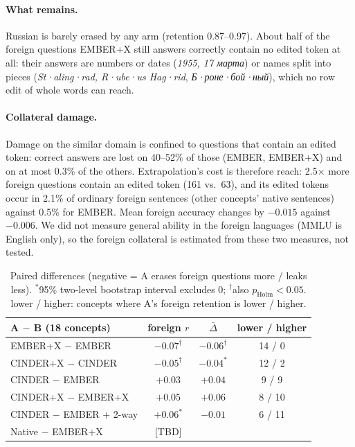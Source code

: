 \paragraph{What remains.}
Russian is barely erased by any arm (retention 0.87--0.97).
About half of the foreign questions EMBER+X still answers correctly contain no edited token at all: their answers are numbers or dates (\emph{1955, 17 марта}) or names split into pieces (\emph{St·aling·rad, R·ube·us Hag·rid}, \emph{Б·роне·бой·ный}), which no row edit of whole words can reach.

\paragraph{Collateral damage.}
Damage on the similar domain is confined to questions that contain an edited token: correct answers are lost on 40--52\% of those (EMBER, EMBER+X) and on at most 0.3\% of the others.
Extrapolation's cost is therefore reach: 2.5$\times$ more foreign \simtest{} questions contain an edited token (161 vs.\ 63), and its edited tokens occur in 2.1\% of ordinary foreign sentences (other concepts' native sentences) against 0.5\% for EMBER.
Mean foreign \simtest{} accuracy changes by $-0.015$ against $-0.006$.
We did not measure general ability in the foreign languages (MMLU is English only), so the foreign collateral is estimated from these two measures, not tested.

\begin{table}[t]
\centering\small
\setlength{\tabcolsep}{3pt}
\begin{tabular}{@{}lccc@{}}
\toprule
A $-$ B (18 concepts) & foreign $r$ & $\bar\Delta$ & lower / higher \\
\midrule
EMBER+X $-$ EMBER        & $-0.07^{\dagger}$ & $-0.06^{\dagger}$ & 14 / 0 \\
CINDER+X $-$ CINDER      & $-0.05^{\dagger}$ & $-0.04^{*}$ & 12 / 2 \\
CINDER $-$ EMBER         & $+0.03$ & $+0.04$ & 9 / 9 \\
CINDER+X $-$ EMBER+X     & $+0.05$ & $+0.06$ & 8 / 10 \\
CINDER $-$ EMBER + 2-way & $+0.06^{*}$ & $-0.01$ & 6 / 11 \\
Native $-$ EMBER+X       & [TBD] & & \\
\bottomrule
\end{tabular}
\caption{Paired differences (negative = A erases foreign questions more / leaks less). $^*$95\% two-level bootstrap interval excludes 0; $^{\dagger}$also $p_{\text{Holm}} < 0.05$. lower / higher: concepts where A's foreign retention is lower / higher.}
\label{tab:fair_pairs}
\end{table}

